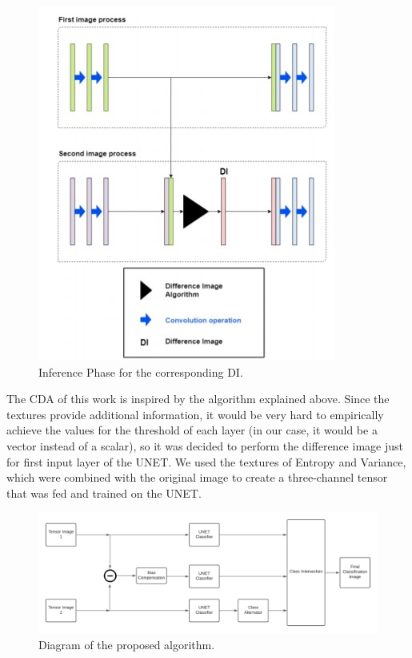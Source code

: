 \begin{figure}[ht]
    \centering
    \includegraphics[width=.9\textwidth]{Chapter7/kevin_algorithm.jpg}
    \caption{Inference Phase for the corresponding DI.}
    \label{fig:kevin_algorithm}
\end{figure}

The CDA of this work is inspired by the algorithm explained above. Since the textures provide additional information, it would be very hard to empirically achieve the values for the threshold of each layer (in our case, it would be a vector instead of a scalar), so it was decided to perform the difference image just for first input layer of the UNET. We used the textures of Entropy and Variance, which were combined with the original image to create a three-channel tensor that was fed and trained on the UNET.

\begin{figure}[ht]
    \centering
    \includegraphics[width=\linewidth]{Chapter7/diagrama.png}
    \caption{ Diagram of the proposed algorithm.}
    \label{fig:diagrama}
\end{figure}

